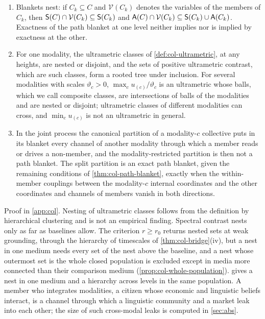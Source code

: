\begin{proposition}\label{prop:col-nesting}
\begin{enumerate}
\item[(a)] Blankets nest: if $C_k\subseteq C$ and $\mathcal V(C_k)$ denotes the variables of the members of $C_k$, then $\mathsf{S}(C)\cap\mathcal V(C_k)\subseteq\mathsf{S}(C_k)$ and $\mathsf{A}(C)\cap\mathcal V(C_k)\subseteq\mathsf{S}(C_k)\cup\mathsf{A}(C_k)$. Exactness of the path blanket at one level neither implies nor is implied by exactness at the other.
\item[(b)] For one modality, the ultrametric classes of \cref{def:col-ultrametric}, at any heights, are nested or disjoint, and the sets of positive ultrametric contrast, which are such classes, form a rooted tree under inclusion. For several modalities with scales $\vartheta_c>0$, $\max_cu_{(c)}/\vartheta_c$ is an ultrametric whose balls, which we call composite classes, are intersections of balls of the modalities and are nested or disjoint; ultrametric classes of different modalities can cross, and $\min_cu_{(c)}$ is not an ultrametric in general.
\item[(c)] In the joint process the canonical partition of a modality-$c$ collective puts in its blanket every channel of another modality through which a member reads or drives a non-member, and the modality-restricted partition is then not a path blanket. The split partition is an exact path blanket, given the remaining conditions of \cref{thm:col-path-blanket}, exactly when the within-member couplings between the modality-$c$ internal coordinates and the other coordinates and channels of members vanish in both directions.
\end{enumerate}
\end{proposition}
Proof in \cref{app:col}. Nesting of ultrametric classes follows from the definition by hierarchical clustering and is not an empirical finding. Spectral contrast nests only as far as baselines allow. The criterion $r\ge r_0$ returns nested sets at weak grounding, through the hierarchy of timescales of \cref{thm:col-bridge}(iv), but a nest in one medium needs every set of the nest above the baseline, and a nest whose outermost set is the whole closed population is excluded except in media more connected than their comparison medium (\cref{prop:col-whole-population}).  gives a nest in one medium and a hierarchy across levels in the same population. A member who integrates modalities, a citizen whose economic and linguistic beliefs interact, is a channel through which a linguistic community and a market leak into each other; the size of such cross-modal leaks is computed in \cref{sec:abs}.

